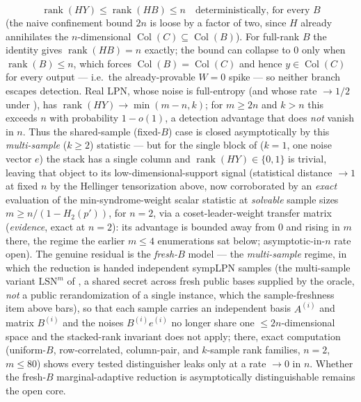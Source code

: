 \documentclass[11pt,a4paper]{article}
\theoremstyle{plain}
\theoremstyle{definition}
\begin{document}
\begin{enumerate}
\[
\operatorname{rank}(HY) \le \operatorname{rank}(HB) \le n \quad \text{deterministically, for every } B
\]
(the naive confinement bound $2n$ is loose by a factor of two, since $H$ already annihilates the $n$-dimensional $\operatorname{Col}(C)\subseteq\operatorname{Col}(B)$). For full-rank $B$ the identity gives $\operatorname{rank}(HB)=n$ exactly; the bound can collapse to $0$ only when $\operatorname{rank}(B)\le n$, which forces $\operatorname{Col}(B)=\operatorname{Col}(C)$ and hence $y\in\operatorname{Col}(C)$ for every output --- i.e.\ the already-provable $W=0$ spike --- so neither branch escapes detection. Real LPN, whose noise is full-entropy (and whose rate $\to 1/2$ under ), has $\operatorname{rank}(HY) \to \min(m-n, k)$; for $m \ge 2n$ and $k > n$ this exceeds $n$ with probability $1 - o(1)$, a detection advantage that does \emph{not} vanish in $n$. Thus the shared-sample (fixed-$B$) case is closed asymptotically by this \emph{multi-sample} ($k\ge 2$) statistic --- but for the single block of  ($k=1$, one noise vector $e$) the stack has a single column and $\operatorname{rank}(HY)\in\{0,1\}$ is trivial, leaving that object to its low-dimensional-support signal (statistical distance $\to 1$ at fixed $n$ by the Hellinger tensorization above, now corroborated by an \emph{exact} evaluation of the min-syndrome-weight scalar statistic at \emph{solvable} sample sizes $m\ge n/(1-H_2(p'))$, for $n=2$, via a coset-leader-weight transfer matrix (\emph{evidence}, exact at $n=2$): its advantage is bounded away from $0$ and rising in $m$ there, the regime the earlier $m\le 4$ enumerations sat below; asymptotic-in-$n$ rate open). The genuine residual is the \emph{fresh-$B$} model --- the \emph{multi-sample} regime, in which the reduction is handed independent sympLPN samples (the multi-sample variant $\mathrm{LSN}^m$ of \cite{KLP+25}, a shared secret across fresh public bases supplied by the oracle, \emph{not} a public rerandomization of a single instance, which the sample-freshness item above bars), so that each sample carries an independent basis $A^{(i)}$ and matrix $B^{(i)}$ and the noises $B^{(i)}e^{(i)}$ no longer share one $\le 2n$-dimensional space and the stacked-rank invariant does not apply; there, exact computation (uniform-$B$, row-correlated, column-pair, and $k$-sample rank families, $n=2$, $m \le 80$) shows every tested distinguisher leaks only at a rate $\to 0$ in $n$. Whether the fresh-$B$ marginal-adaptive reduction is asymptotically distinguishable remains the open core.
\end{enumerate}
\end{document}
